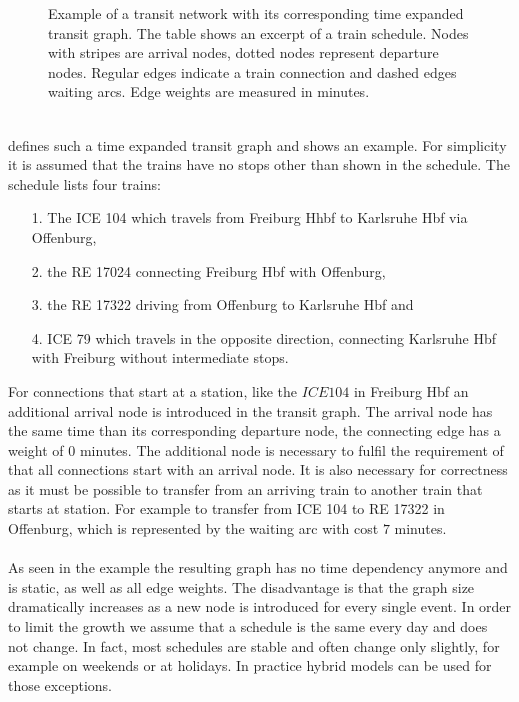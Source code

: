 \begin{figure}[!ht]
\begin{center}
		\end{center}
		\caption{Example of a transit network with its corresponding time expanded transit graph.
			The table shows an excerpt of a train schedule. Nodes with stripes are arrival nodes,
			dotted nodes represent departure nodes. Regular edges indicate a train connection
			and dashed edges waiting arcs. Edge weights are measured in minutes.}
		\label{transitGraphExample}
	\end{figure}\quad\\
	 defines such a time expanded transit graph and  shows an example.
	For simplicity it is assumed that the trains have no stops other than shown in the schedule. The schedule lists four trains:
	\begin{itemize}
		\item[1.] The ICE 104 which travels from Freiburg Hhbf to Karlsruhe Hbf via Offenburg,
		\item[2.] the RE 17024 connecting Freiburg Hbf with Offenburg,
		\item[3.] the RE 17322 driving from Offenburg to Karlsruhe Hbf and
		\item[4.] ICE 79 which travels in the opposite direction, connecting Karlsruhe Hbf with Freiburg without intermediate stops.
	\end{itemize}
	For connections that start at a station, like the $ICE 104$ in Freiburg Hbf an additional arrival node is introduced
	in the transit graph. The arrival node has the same time than its corresponding departure node, the connecting
	edge has a weight of $0$ minutes. The additional node is necessary to fulfil the requirement of
	 that all connections start with an arrival node. It is also necessary for correctness as it must
	be possible to transfer from an arriving train to another train that starts at station. For example to transfer from ICE 104
	to RE 17322 in Offenburg, which is represented by the waiting arc with cost $7$ minutes.\\\\
	As seen in the example the resulting graph has no time dependency anymore and is static, as well as all edge weights.
	The disadvantage is that the graph size dramatically increases as a new node is introduced for every single event.
	In order to limit the growth we assume that a schedule is the same every day and does not change. In fact, most schedules are
	stable and often change only slightly, for example on weekends or at holidays. In practice hybrid models can be used for
	those exceptions.
